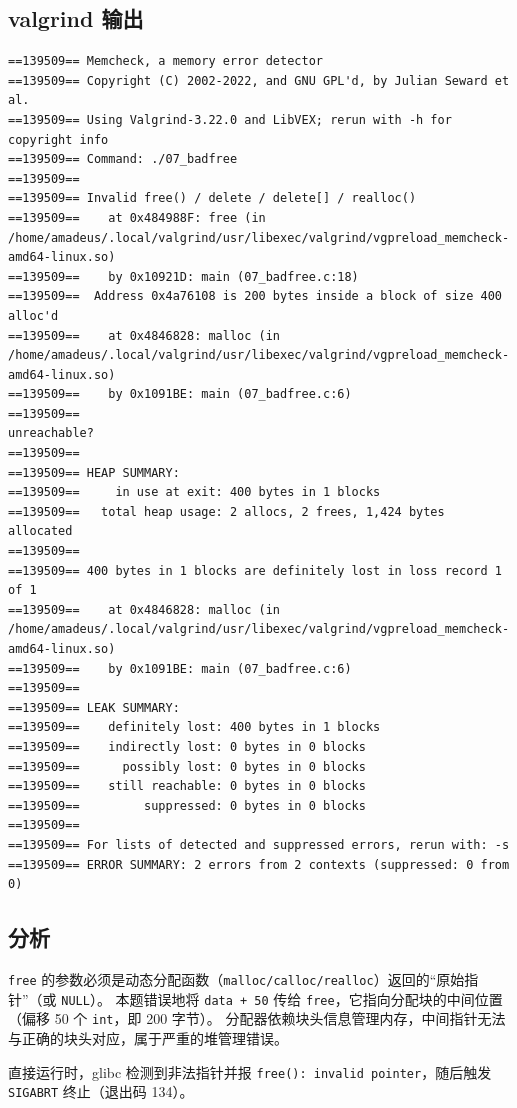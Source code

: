 \documentclass[fleqn]{ctexart}
\begin{document}
\subsection*{valgrind 输出}
\begin{verbatim}
==139509== Memcheck, a memory error detector
==139509== Copyright (C) 2002-2022, and GNU GPL'd, by Julian Seward et al.
==139509== Using Valgrind-3.22.0 and LibVEX; rerun with -h for copyright info
==139509== Command: ./07_badfree
==139509== 
==139509== Invalid free() / delete / delete[] / realloc()
==139509==    at 0x484988F: free (in /home/amadeus/.local/valgrind/usr/libexec/valgrind/vgpreload_memcheck-amd64-linux.so)
==139509==    by 0x10921D: main (07_badfree.c:18)
==139509==  Address 0x4a76108 is 200 bytes inside a block of size 400 alloc'd
==139509==    at 0x4846828: malloc (in /home/amadeus/.local/valgrind/usr/libexec/valgrind/vgpreload_memcheck-amd64-linux.so)
==139509==    by 0x1091BE: main (07_badfree.c:6)
==139509== 
unreachable?
==139509== 
==139509== HEAP SUMMARY:
==139509==     in use at exit: 400 bytes in 1 blocks
==139509==   total heap usage: 2 allocs, 2 frees, 1,424 bytes allocated
==139509== 
==139509== 400 bytes in 1 blocks are definitely lost in loss record 1 of 1
==139509==    at 0x4846828: malloc (in /home/amadeus/.local/valgrind/usr/libexec/valgrind/vgpreload_memcheck-amd64-linux.so)
==139509==    by 0x1091BE: main (07_badfree.c:6)
==139509== 
==139509== LEAK SUMMARY:
==139509==    definitely lost: 400 bytes in 1 blocks
==139509==    indirectly lost: 0 bytes in 0 blocks
==139509==      possibly lost: 0 bytes in 0 blocks
==139509==    still reachable: 0 bytes in 0 blocks
==139509==         suppressed: 0 bytes in 0 blocks
==139509== 
==139509== For lists of detected and suppressed errors, rerun with: -s
==139509== ERROR SUMMARY: 2 errors from 2 contexts (suppressed: 0 from 0)
\end{verbatim}

\subsection*{分析}
\verb|free| 的参数必须是动态分配函数（\verb|malloc/calloc/realloc|）返回的“原始指针”（或 \verb|NULL|）。
本题错误地将 \verb|data + 50| 传给 \verb|free|，它指向分配块的中间位置（偏移 50 个 \verb|int|，即 200 字节）。
分配器依赖块头信息管理内存，中间指针无法与正确的块头对应，属于严重的堆管理错误。

直接运行时，glibc 检测到非法指针并报 \verb|free(): invalid pointer|，随后触发 \verb|SIGABRT| 终止（退出码 134）。
\end{document}
